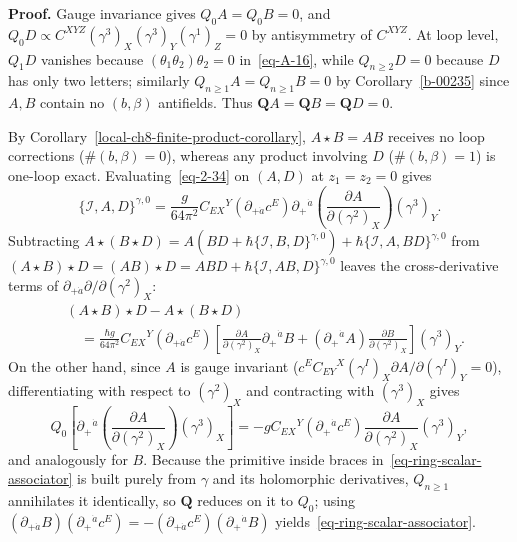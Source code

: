 \documentclass[11pt]{article}
\numberwithin{equation}{section}
\numberwithin{figure}{section}
\numberwithin{table}{section}
\begin{document}
\begin{proofbox}
\textbf{Proof.} Gauge invariance gives $Q_0A=Q_0B=0$, and $Q_0D\propto C^{XYZ}(\gamma^3)_X(\gamma^3)_Y(\gamma^1)_Z=0$ by antisymmetry of $C^{XYZ}$. At loop level, $Q_1D$ vanishes because $(\theta_1\theta_2)\theta_2=0$ in~\eqref{eq-A-16}, while $Q_{n\ge2}D=0$ because $D$ has only two letters; similarly $Q_{n\ge1}A=Q_{n\ge1}B=0$ by Corollary~\ref{b-00235} since $A,B$ contain no $(b,\beta)$ antifields. Thus $\mathbf QA=\mathbf QB=\mathbf QD=0$.

By Corollary~\ref{local-ch8-finite-product-corollary}, $A\star B=AB$ receives no loop corrections ($\#(b,\beta)=0$), whereas any product involving $D$ ($\#(b,\beta)=1$) is one-loop exact. Evaluating~\eqref{eq-2-34} on $(A,D)$ at $z_1=z_2=0$ gives
\begin{equation*}
\{\mathcal I,A,D\}^{\gamma,0}
=\frac{g}{64\pi^2}C_{EX}{}^Y
(\partial_{+\dot a}c^E)
\partial_+{}^{\dot a}
\left(\frac{\partial A}{\partial(\gamma^2)_X}\right)
(\gamma^3)_Y.
\end{equation*}
Subtracting $A\star(B\star D)=A(BD+\hbar\{\mathcal I,B,D\}^{\gamma,0})+\hbar\{\mathcal I,A,BD\}^{\gamma,0}$ from $(A\star B)\star D=(AB)\star D=ABD+\hbar\{\mathcal I,AB,D\}^{\gamma,0}$ leaves the cross-derivative terms of $\partial_{+\dot a}\partial/\partial(\gamma^2)_X$:
\begin{equation*}
\begin{aligned}
&(A\star B)\star D-A\star(B\star D)\\
&\quad=\frac{\hbar g}{64\pi^2}C_{EX}{}^Y
(\partial_{+\dot a}c^E)
\left[
\frac{\partial A}{\partial(\gamma^2)_X}
\partial_+{}^{\dot a}B
+(\partial_+{}^{\dot a}A)
\frac{\partial B}{\partial(\gamma^2)_X}
\right](\gamma^3)_Y.
\end{aligned}
\end{equation*}
On the other hand, since $A$ is gauge invariant ($c^EC_{EY}{}^X(\gamma^I)_X\partial A/\partial(\gamma^I)_Y=0$), differentiating with respect to $(\gamma^2)_X$ and contracting with $(\gamma^3)_X$ gives
\begin{equation*}
Q_0\left[
\partial_+{}^{\dot a}\left(
\frac{\partial A}{\partial(\gamma^2)_X}\right)(\gamma^3)_X
\right]
=-gC_{EX}{}^Y(\partial_+{}^{\dot a}c^E)
\frac{\partial A}{\partial(\gamma^2)_X}(\gamma^3)_Y,
\end{equation*}
and analogously for $B$. Because the primitive inside braces in~\eqref{eq-ring-scalar-associator} is built purely from $\gamma$ and its holomorphic derivatives, $Q_{n\ge1}$ annihilates it identically, so $\mathbf Q$ reduces on it to $Q_0$; using $(\partial_{+\dot a}B)(\partial_+{}^{\dot a}c^E)=-(\partial_{+\dot a}c^E)(\partial_+{}^{\dot a}B)$ yields~\eqref{eq-ring-scalar-associator}.~\hfill\qedsymbol
\end{proofbox}
\end{document}
